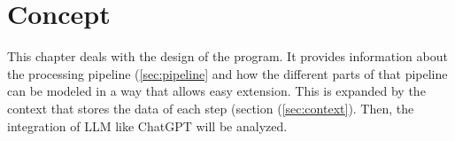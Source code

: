 \begingroup
\renewcommand{\cleardoublepage}{} %
\renewcommand{\clearpage}{}
\chapter{Concept}\label{chapter:conception}
\endgroup
This chapter deals with the design of the program. It provides information about the processing pipeline (\ref{sec:pipeline} and how the different parts of that pipeline can be modeled in a way that allows easy extension. This is expanded by the context that stores the data of each step (section (\ref{sec:context}). Then, the integration of \ac{LLM} like ChatGPT will be analyzed. 





